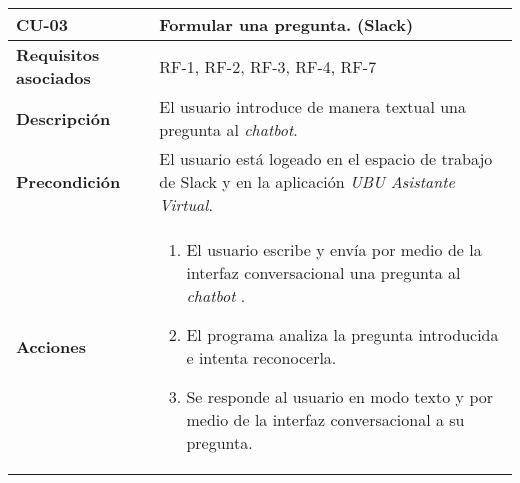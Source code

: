 \newpage
\begin{longtable}[H]{@{}ll@{}}
	\toprule
	\begin{minipage}[b]{0.23\columnwidth}\raggedright\strut
		\textbf{CU-03}\strut
	\end{minipage} & \begin{minipage}[b]{0.71\columnwidth}\raggedright\strut
		\textbf{Formular una pregunta. (Slack) }\strut
	\end{minipage}\tabularnewline
	\midrule
	\endhead  
	\begin{minipage}[t]{0.23\columnwidth}\raggedright\strut
		\textbf{Requisitos asociados}\strut
	\end{minipage} & \begin{minipage}[t]{0.71\columnwidth}\raggedright\strut
		RF-1, RF-2, RF-3, RF-4, RF-7\strut
	\end{minipage}\tabularnewline
	\begin{minipage}[t]{0.23\columnwidth}\raggedright\strut
		\textbf{Descripción}\strut
	\end{minipage} & \begin{minipage}[t]{0.71\columnwidth}\raggedright\strut
		El usuario introduce de manera textual una pregunta al \textit{chatbot}.\strut
	\end{minipage}\tabularnewline
	\begin{minipage}[t]{0.23\columnwidth}\raggedright\strut
		\textbf{Precondición}\strut
	\end{minipage} & \begin{minipage}[t]{0.71\columnwidth}\raggedright\strut
		El usuario está logeado en el espacio de trabajo de Slack y en la aplicación \textit{UBU Asistante Virtual}.
	\end{minipage}\tabularnewline
	\begin{minipage}[t]{0.23\columnwidth}\raggedright\strut
		\textbf{Acciones}\strut
	\end{minipage} & \begin{minipage}[t]{0.71\columnwidth}\raggedright\strut
		\begin{enumerate}
			\def\labelenumi{\arabic{enumi}.}
			\tightlist
			\item
			El usuario escribe y envía por medio de la interfaz conversacional una pregunta al \textit{chatbot	}.
			\item
			El programa analiza la pregunta introducida e intenta reconocerla.
			\item
			Se responde al usuario en modo texto y por medio de la interfaz conversacional a su pregunta. 

\end{enumerate}
\end{minipage}
\end{longtable}
